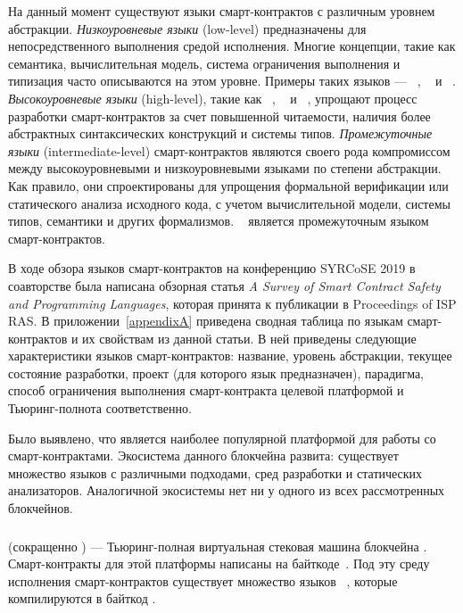 На данный момент существуют языки смарт-контрактов с различным уровнем абстракции. 
\emph{Низкоуровневые языки} (low-level) предназначены для непосредственного выполнения средой исполнения.
Многие концепции, такие как семантика, вычислительная модель, система ограничения выполнения и типизация часто описываются на этом уровне.
Примеры таких языков --- ~\cite{EthereumYellowPaper}, ~\cite{BitcoinScript} и ~\cite{Michelson}.
\emph{Высокоуровневые языки} (high-level), такие как ~\cite{Solidity}, ~\cite{Flint} и ~\cite{liquidity},
упрощают процесс разработки смарт-контрактов за счет повышенной читаемости, наличия более абстрактных синтаксических конструкций и системы типов.
\emph{Промежуточные языки} (intermediate-level) смарт-контрактов являются своего рода компромиссом между высокоуровневыми и низкоуровневыми языками по степени абстракции.
Как правило, они спроектированы для упрощения формальной верификации или статического анализа исходного кода, с учетом вычислительной модели, системы типов, семантики и других формализмов.
~\cite{Scilla} является промежуточным языком смарт-контрактов.

В ходе обзора языков смарт-контрактов на конференцию SYRCoSE 2019 в соавторстве была написана
обзорная статья \emph{A Survey of Smart Contract Safety and Pro\-gram\-ming Languages}, которая принята к публикации в Proceedings of ISP RAS.
В приложении~\ref{appendixA} приведена сводная таблица по языкам смарт-кон\-трак\-тов и их свойствам из данной статьи.
В ней приведены следующие характеристики языков смарт-контрактов: название, уровень абстракции, текущее состояние разработки, проект (для которого язык предназначен), парадигма, способ ограничения выполнения смарт-контракта целевой платформой и Тьюринг-полнота соответственно.

Было выявлено, что  является наиболее популярной платформой для работы со смарт-контрактами.
Экосистема данного блокчейна развита: существует множество языков с различными подходами, сред разработки и статических анализаторов.
Аналогичной экосистемы нет ни у одного из всех рассмотренных блокчейнов.


\subsubsection{}
 (сокращенно ) --- Тьюринг-полная виртуальная стековая машина блокчейна .
Смарт-контракты для этой платформы написаны на байткоде~\cite{EthereumYellowPaper}.
Под эту среду исполнения смарт-контрактов существует множество языков ~\cite{Bamboo, Flint, IELE, Logikon, Solidity, SolidityX, Vyper, LLL, Yul}, которые компилируются в байткод .

